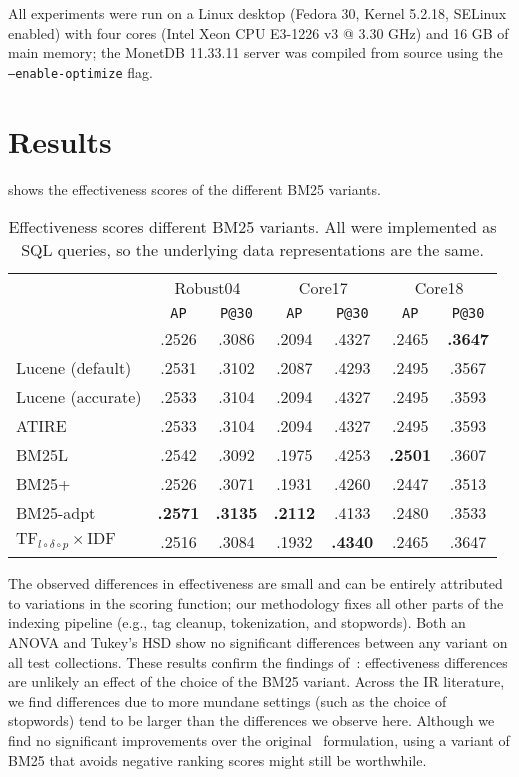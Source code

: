 All experiments were run on a Linux desktop (Fedora 30, Kernel 5.2.18, SELinux enabled) with four cores (Intel Xeon CPU E3-1226 v3 @ 3.30 GHz) and 16 GB of main memory; the MonetDB 11.33.11 server was compiled from source using the \texttt{---enable-optimize} flag.

\section{Results}
 shows the effectiveness scores of the different BM25 variants.  
\begin{table}
	\centering
	\caption{Effectiveness scores different BM25 variants. All were implemented as SQL queries, so the underlying data representations are the same.}
	\label{bm25_variant_results}
	\begin{tabular}{l c c c c c c}
		\toprule
		&\multicolumn{2}{c}{Robust04}&\multicolumn{2}{c}{Core17}&\multicolumn{2}{c}{Core18}\\
		&\texttt{AP}&\texttt{P@30}&\texttt{AP}&\texttt{P@30}&\texttt{AP}&\texttt{P@30}\\
		\midrule
		{\small \citeauthor{bm25-robertson}} & .2526 & .3086 & .2094 & .4327 & .2465 & \textbf{.3647} \\ 
		{\small Lucene (default)} & .2531 & .3102 & .2087 & .4293 & .2495 & .3567 \\ 
		{\small Lucene (accurate)} & .2533 & .3104 & .2094 & .4327 & .2495 & .3593 \\ 
		{\small ATIRE} & .2533 & .3104 & .2094 & .4327 & .2495 & .3593 \\ 
		{\small BM25L} & .2542 & .3092 & .1975 & .4253 & \textbf{.2501} & .3607 \\ 
		{\small BM25+} & .2526 & .3071 & .1931 & .4260 & .2447 & .3513 \\ 
		{\small BM25-adpt} & \textbf{.2571} & \textbf{.3135} & \textbf{.2112} & .4133 & .2480 & .3533\\ 
		{\small $\text{TF}_{l\circ\delta\circ p}\times\text{IDF}$} & .2516 & .3084 & .1932 & \textbf{.4340} & .2465 & .3647\\ 
		\bottomrule
	\end{tabular}
\end{table}
The observed differences in effectiveness are small and can be entirely attributed to variations in the scoring function; our methodology fixes all other parts of the indexing pipeline (e.g., tag cleanup, tokenization, and stopwords). Both an ANOVA and Tukey’s HSD show no significant differences between any variant on all test collections. These results confirm the findings of~\citet{trotman-bm25}: effectiveness differences are unlikely an effect of the choice of the BM25 variant. Across the IR literature, we find differences due to more mundane settings (such as the choice of stopwords) tend to be larger than the differences we observe here. Although we find no significant improvements over the original~\citep{bm25-robertson} formulation, using a variant of BM25 that avoids negative ranking scores might still be worthwhile.

